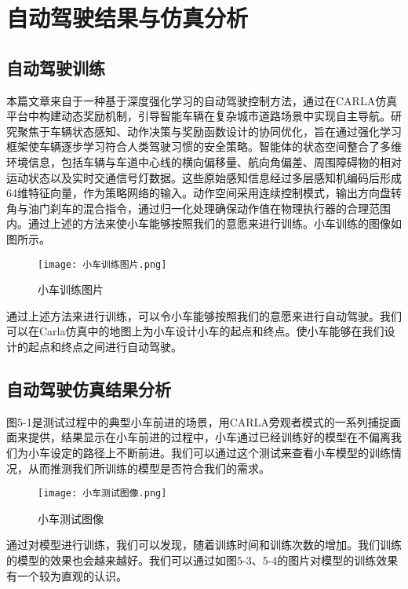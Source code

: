 \chapter{自动驾驶结果与仿真分析}

\section{自动驾驶训练}

本篇文章来自于一种基于深度强化学习的自动驾驶控制方法，通过在CARLA仿真平台中构建动态奖励机制，引导智能车辆在复杂城市道路场景中实现自主导航。研究聚焦于车辆状态感知、动作决策与奖励函数设计的协同优化，旨在通过强化学习框架使车辆逐步学习符合人类驾驶习惯的安全策略。智能体的状态空间整合了多维环境信息，包括车辆与车道中心线的横向偏移量、航向角偏差、周围障碍物的相对运动状态以及实时交通信号灯数据。这些原始感知信息经过多层感知机编码后形成64维特征向量，作为策略网络的输入。动作空间采用连续控制模式，输出方向盘转角与油门刹车的混合指令，通过归一化处理确保动作值在物理执行器的合理范围内。通过上述的方法来使小车能够按照我们的意愿来进行训练。小车训练的图像如图所示。

\begin{figure}[hbt]
	\centering
	\texttt{[image: 小车训练图片.png]}
	\caption{小车训练图片}
	\label{f.example}
\end{figure}

通过上述方法来进行训练，可以令小车能够按照我们的意愿来进行自动驾驶。我们可以在Carla仿真中的地图上为小车设计小车的起点和终点。使小车能够在我们设计的起点和终点之间进行自动驾驶。


\section{自动驾驶仿真结果分析}


图5-1是测试过程中的典型小车前进的场景，用CARLA旁观者模式的一系列捕捉画面来提供，结果显示在小车前进的过程中，小车通过已经训练好的模型在不偏离我们为小车设定的路径上不断前进。我们可以通过这个测试来查看小车模型的训练情况，从而推测我们所训练的模型是否符合我们的需求。

\begin{figure}[hbt]
	\centering
	\texttt{[image: 小车测试图像.png]}
	\caption{小车测试图像}
	\label{f.example}
\end{figure}

通过对模型进行训练，我们可以发现，随着训练时间和训练次数的增加。我们训练的模型的效果也会越来越好。我们可以通过如图5-3、5-4的图片对模型的训练效果有一个较为直观的认识。

